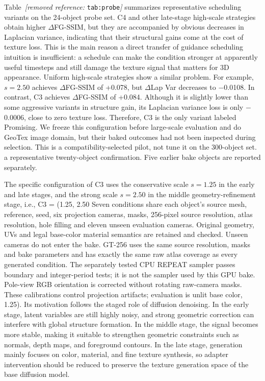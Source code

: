 \documentclass[times,twocolumn,final]{elsarticle}
\providecommand{\DIFadd}[1]{{\protect\color{blue} \sf #1}} %
\providecommand{\DIFdel}[1]{{\protect\color{red} \scriptsize #1}} %
\providecommand{\DIFaddbegin}{} %
\providecommand{\DIFaddend}{} %
\providecommand{\DIFdelbegin}{} %
\providecommand{\DIFdelend}{} %
\begin{document}
\DIFdel{Table~\textit{[removed reference: }\texttt{tab:probe}\textit{]} summarizes representative scheduling variants on the 24-object probe set. C4 and other late-stage high-scale strategies obtain higher $\Delta$FG-SSIM, but they are accompanied by obvious decreases in Laplacian variance, indicating that their structural gains come at the cost of texture loss. This is the main reason a direct transfer of guidance scheduling intuition is insufficient: a schedule can make the condition stronger at apparently useful timesteps and still damage the texture signal that matters for 3D appearance. Uniform high-scale strategies show a similar problem.
For example, $s = 2.50$ achieves $\Delta$FG-SSIM of +0.078, but $\Delta$Lap Var decreases to $-$0.0108. In contrast, C3 achieves $\Delta$FG-SSIM of +0.084. Although it is slightly lower than some aggressive variants in structure gain, its Laplacian variance loss is only $-$0.0006, close to zero texture loss. Therefore, C3 is the only variant labeled Promising. We freeze this configuration before large-scale evaluation and do }\DIFdelend \DIFaddbegin \DIFadd{GeoTex image domain, but their baked outcomes had not been inspected during selection. This is a compatibility-selected pilot, }\DIFaddend not \DIFdelbegin \DIFdel{tune it on the 300-object set. }\DIFdelend \DIFaddbegin \DIFadd{a representative twenty-object confirmation. Five earlier bake objects are reported separately.
}\DIFaddend 

\DIFdelbegin \DIFdel{The specific configuration of C3 uses the conservative scale $s = 1.25$ in the early and late stages, and the strong scale $s = 2.50$ in the middle geometry-refinement stage, i.e., C3 = (1.25, 2.50}\DIFdelend \DIFaddbegin \DIFadd{Seven conditions share each object's source mesh, reference, seed, six projection cameras, masks, 256-pixel source resolution, atlas resolution, hole filling and eleven unseen evaluation cameras. Original geometry, UVs and legal base-color material semantics are retained and checked. Unseen cameras do not enter the bake. GT-256 uses the same source resolution, masks and bake parameters and has exactly the same raw atlas coverage as every generated condition. The separately tested CPU REPEAT sampler passes boundary and integer-period tests; it is not the sampler used by this GPU bake. Pole-view RGB orientation is corrected without rotating raw-camera masks. These calibrations control projection artifacts; evaluation is unlit base color}\DIFaddend , \DIFdelbegin \DIFdel{1.25). Its motivation follows the staged role of diffusion denoising. In the early stage, latent variables are still highly noisy, and strong geometric correction can interfere with global structure formation. In the middle stage, the signal becomes more stable, making it suitable to strengthen geometric constraints such as normals, depth maps, and foreground contours. In the late stage, generation mainly focuses on color, material, and fine texture synthesis, so adapter intervention should be reduced to preserve the texture generation space of the base diffusion model. }%
\end{document}
